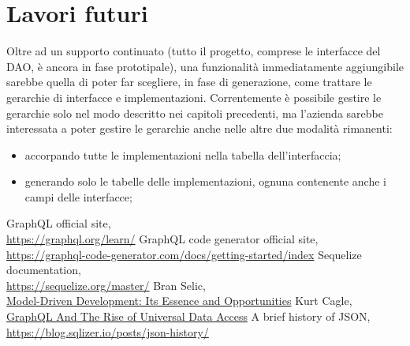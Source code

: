 \documentclass[a4paper, 12pt]{report}
\begin{document}
      \section*{Lavori futuri}
        Oltre ad un supporto continuato (tutto il progetto, comprese le interfacce del DAO, è ancora in fase prototipale), una funzionalità immediatamente aggiungibile sarebbe quella di poter far scegliere, in fase di generazione, come trattare le gerarchie di interfacce e implementazioni.
        Correntemente è possibile gestire le gerarchie solo nel modo descritto nei capitoli precedenti, ma l'azienda sarebbe interessata a poter gestire le gerarchie anche nelle altre due modalità rimanenti:
        \begin{itemize}
          \item accorpando tutte le implementazioni nella tabella dell'interfaccia;
          \item generando solo le tabelle delle implementazioni, ognuna contenente anche i campi delle interfacce;
        \end{itemize}
    \newpage
    \begin{thebibliography}{3}
      GraphQL official site,\\\href{https://graphql.org/learn/}{https://graphql.org/learn/}
      GraphQL code generator official site,\\\href{https://graphql-code-generator.com/docs/getting-started/index}{https://graphql-code-generator.com/docs/getting-started/index}
      Sequelize documentation,\\\href{https://sequelize.org/master/}{https://sequelize.org/master/}
      Bran Selic,\\\href{https://www.researchgate.net/publication/221249899_Model-Driven_Development_Its_Essence_and_Opportunities}{Model-Driven Development: Its Essence and Opportunities}
      Kurt Cagle,\\\href{https://www.forbes.com/sites/cognitiveworld/2019/10/28/graphql-and-the-rise-of-universal-data-access/?sh=3cb700ac1f71}{GraphQL And The Rise of Universal Data Access}
      A brief history of JSON,\\\href{https://blog.sqlizer.io/posts/json-history/}{https://blog.sqlizer.io/posts/json-history/}
    \end{thebibliography}
\end{document}
